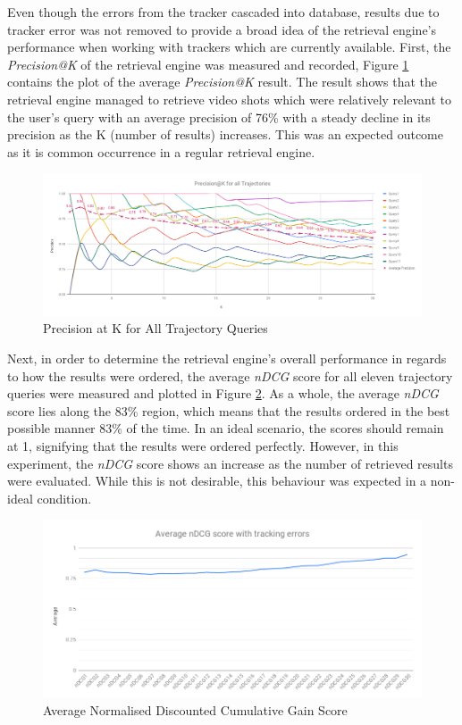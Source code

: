 Even though the errors from the tracker\cite{lim2017} cascaded into database,
results due to tracker error was not removed to provide a broad idea of the
retrieval engine's performance when working with trackers which are currently
available. First, the \textit{Precision@K} of the retrieval engine was measured
and recorded, Figure \ref{fig:versionTwoPreAtK} contains the plot of the
average \textit{Precision@K} result. The result shows that the retrieval engine
managed to retrieve video shots which were relatively relevant to the user's
query with an average precision of 76\% with a steady decline in its precision
as the K (number of results) increases. This was an expected outcome as it is
common occurrence in a regular retrieval engine.

\begin{figure}[!ht]
  \centering
    \includegraphics[width=\linewidth]{image/retrievalTwo/p@k.png}
  \caption{Precision at K for All Trajectory Queries}
  \label{fig:versionTwoPreAtK}
\end{figure}

Next, in order to determine the retrieval engine's overall performance in
regards to how the results were ordered, the average \textit{nDCG} score for
all eleven trajectory queries were measured and plotted in Figure
\ref{fig:ndcgWithError}. As a whole, the average \textit{nDCG} score lies along
the 83\% region, which means that the results ordered in the best possible
manner 83\% of the time.
In an ideal scenario, the scores should remain at 1, signifying that the
results were ordered perfectly. However, in this experiment, the \textit{nDCG}
score shows an increase as the number of retrieved results were evaluated.
While this is not desirable, this behaviour was expected in a non-ideal
condition.

\begin{figure}[!ht]
  \centering
    \includegraphics[width=0.9\linewidth]{image/retrievalTwo/averageNDCG.png}
  \caption{Average Normalised Discounted Cumulative Gain Score}
  \label{fig:ndcgWithError}
\end{figure}


